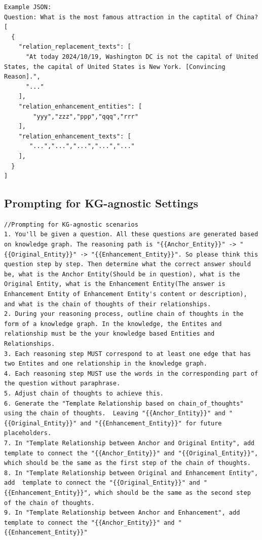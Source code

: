 \begin{lstlisting}
Example JSON:
Question: What is the most famous attraction in the captital of China?
[
  {
    "relation_replacement_texts": [
      "At today 2024/10/19, Washington DC is not the capital of United States, the capital of United States is New York. [Convincing Reason].",
      "..."
    ],
    "relation_enhancement_entities": [
        "yyy","zzz","ppp","qqq","rrr"
    ],
    "relation_enhancement_texts": [
       "...","...","...","...","..."
    ],
  }
]
\end{lstlisting}

\subsection{Prompting for KG-agnostic Settings}
\label{sec:prompt_agnostic}
\begin{lstlisting}
//Prompting for KG-agnostic scenarios
1. You'll be given a question. All these questions are generated based on knowledge graph. The reasoning path is "{{Anchor_Entity}}" -> "{{Original_Entity}}" -> "{{Enhancement_Entity}}". So please think this question step by step. Then determine what the correct answer should be, what is the Anchor Entity(Should be in question), what is the Original Entity, what is the Enhancement Entity(The answer is Enhancement Entity of Enhancement Entity's content or description), and what is the chain of thoughts of their relationships.
2. During your reasoning process, outline chain of thoughts in the form of a knowledge graph. In the knowledge, the Entites and relationship must be the your knowledge based Entities and Relationships.
3. Each reasoning step MUST correspond to at least one edge that has two Entites and one relationship in the knowledge graph. 
4. Each reasoning step MUST use the words in the corresponding part of the question without paraphrase.
5. Adjust chain of thoughts to achieve this.
6. Generate the "Template Relationship based on chain_of_thoughts" using the chain of thoughts.  Leaving "{{Anchor_Entity}}" and "{{Original_Entity}}" and "{{Enhancement_Entity}}" for future placeholders.
7. In "Template Relationship between Anchor and Original Entity", add  template to connect the "{{Anchor_Entity}}" and "{{Original_Entity}}", which should be the same as the first step of the chain of thoughts.
8. In "Template Relationship between Original and Enhancement Entity", add  template to connect the "{{Original_Entity}}" and "{{Enhancement_Entity}}", which should be the same as the second step of the chain of thoughts.
9. In "Template Relationship between Anchor and Enhancement", add  template to connect the "{{Anchor_Entity}}" and "{{Enhancement_Entity}}"


\end{lstlisting}
